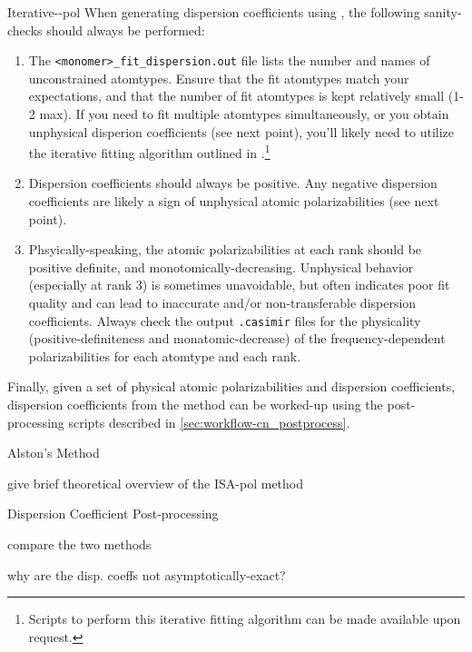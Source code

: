 \begin{subsubsection}{Iterative-\dma-pol}
When generating dispersion coefficients using \idma, the following sanity-checks should
always be performed:
\begin{enumerate}
\item The \verb|<monomer>_fit_dispersion.out| file lists the number and names of
unconstrained atomtypes. Ensure that the fit atomtypes match your
expectations, and that the number of fit atomtypes is kept relatively small
(1-2 max). If you need to fit multiple atomtypes simultaneously, or you obtain
unphysical disperion coefficients (see next point), you'll likely need to
utilize the iterative fitting algorithm outlined in 
.\footnote{Scripts to perform this iterative fitting
algorithm can be made available
upon request.}
%
\item Dispersion coefficients should always be positive. Any negative
dispersion coefficients are likely a sign of unphysical atomic
polarizabilities (see next point).
%
\item Phsyically-speaking, the atomic polarizabilities at each rank should be positive
definite, and monotomically-decreasing.\cite{Williams20013,stone2013theory} Unphysical behavior (especially at
rank 3) is sometimes unavoidable, but often indicates poor fit quality and can
lead to inaccurate and/or non-transferable dispersion coefficients. Always
check the output \verb|.casimir| files for the physicality
(positive-definiteness and monatomic-decrease) of the frequency-dependent
polarizabilities for each atomtype and each rank.
%
\end{enumerate}


Finally, given a set of physical atomic polarizabilities and dispersion
coefficients, dispersion coefficients from the \idma method can be worked-up
using the post-processing scripts described in
\cref{sec:workflow-cn_postprocess}.

\end{subsubsection}
\begin{subsubsection}{Alston's Method}
\label{sec:workflow-alston}

give brief theoretical overview of the ISA-pol method


\end{subsubsection}
\begin{subsubsection}{Dispersion Coefficient Post-processing}
\label{sec:workflow-cn_postprocess}

compare the two methods

why are the disp. coeffs not asymptotically-exact?

\end{subsubsection}
